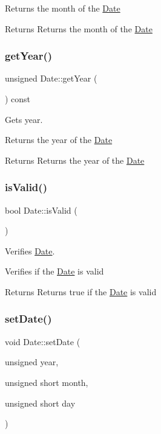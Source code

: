 Returns the month of the \hyperlink{class_date}{Date}

\begin{DoxyReturn}{Returns}
Returns the month of the \hyperlink{class_date}{Date} 
\end{DoxyReturn}
\mbox{\label{class_date_aa1e4066bffc24af79f604dabce27e3cc}} 
\subsubsection{\texorpdfstring{get\+Year()}{getYear()}}
{\footnotesize\ttfamily unsigned Date\+::get\+Year (\begin{DoxyParamCaption}{ }\end{DoxyParamCaption}) const}



Gets year. 

Returns the year of the \hyperlink{class_date}{Date}

\begin{DoxyReturn}{Returns}
Returns the year of the \hyperlink{class_date}{Date} 
\end{DoxyReturn}
\mbox{\label{class_date_a7d9aaa9db591413e21c8b85fdae130ad}} 
\subsubsection{\texorpdfstring{is\+Valid()}{isValid()}}
{\footnotesize\ttfamily bool Date\+::is\+Valid (\begin{DoxyParamCaption}{ }\end{DoxyParamCaption})}



Verifies \hyperlink{class_date}{Date}. 

Verifies if the \hyperlink{class_date}{Date} is valid

\begin{DoxyReturn}{Returns}
Returns true if the \hyperlink{class_date}{Date} is valid 
\end{DoxyReturn}
\mbox{\label{class_date_a8c5fc0dd7ecf3bae6a1de5146fc566e4}} 
\subsubsection{\texorpdfstring{set\+Date()}{setDate()}}
{\footnotesize\ttfamily void Date\+::set\+Date (\begin{DoxyParamCaption}\item[{unsigned}]{year,  }\item[{unsigned short}]{month,  }\item[{unsigned short}]{day }\end{DoxyParamCaption})}



